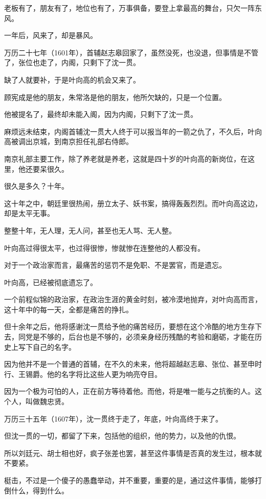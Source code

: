 \begin{multicols}{\theparacolNo}
		老板有了，朋友有了，地位也有了，万事俱备，要登上拿最高的舞台，只欠一阵东风。

		一年后，风来了，却是暴风。

		万历二十七年（1601年），首辅赵志皋回家了，虽然没死，也没退，但事情是不管了，张位也走了，内阁，只剩下了沈一贯。

		缺了人就要补，于是叶向高的机会又来了。

		顾宪成是他的朋友，朱常洛是他的朋友，他所欠缺的，只是一个位置。

		他被提名了，最终却未能入阁，因为内阁，只剩下了沈一贯。

		麻烦远未结束，内阁首辅沈一贯大人终于可以报当年的一箭之仇了，不久后，叶向高被调出京城，到南京担任礼部右侍郎。

		南京礼部主要工作，除了养老就是养老，这就是四十岁的叶向高的新岗位，在这里，他还要呆很久。

		很久是多久？十年。

		这十年之中，朝廷里很热闹，册立太子、妖书案，搞得轰轰烈烈。而叶向高这边，却是太平无事。

		整整十年，无人理，无人问，甚至也无人骂、无人整。

		叶向高过得很太平，也过得很惨，惨就惨在连整他的人都没有。

		对于一个政治家而言，最痛苦的惩罚不是免职、不是罢官，而是遗忘。

		叶向高，已经被彻底遗忘了。

		一个前程似锦的政治家，在政治生涯的黄金时刻，被冷漠地抛弃，对叶向高而言，这十年中的每一天，全都是痛苦的挣扎。

		但十余年之后，他将感谢沈一贯给予他的痛苦经历，要想在这个冷酷的地方生存下去，同党是不够的，后台也是不够的，必须亲身经历残酷的考验和磨砺，才能在历史上写下自己的名字。

		因为他并不是一个普通的首辅，在不久的未来，他将超越赵志皋、张位、甚至申时行、王锡爵。他的名字将比这些人更为响亮夺目。

		因为一个极为可怕的人，正在前方等待着他。而他，将是唯一能与之抗衡的人。这个人，叫做魏忠贤。

		万历三十五年（1607年），沈一贯终于走了，年底，叶向高终于来了。

		但沈一贯的一切，都留了下来，包括他的组织，他的势力，以及他的仇恨。

		所以刘廷元、胡士相也好，疯子张差也罢，甚至这件事情是否真的发生过，根本就不要紧。

		梃击，不过是一个傻子的愚蠢举动，并不重要，重要的是，通过这件事情，能够打倒什么，得到什么。


\end{multicols}
